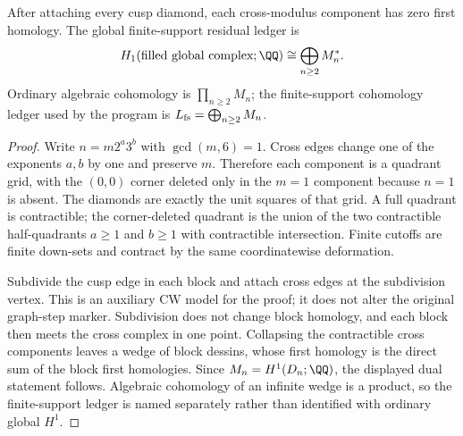 \begin{theorem}
\label{thm:diamond}
After attaching every cusp diamond, each cross-modulus component has zero
first homology.  The global finite-support residual ledger is
\[
  H_1(\text{filled global complex};\QQ)
  \cong\bigoplus_{n\ge2} M_n^* .
\]
Ordinary algebraic cohomology is $\prod_{n\ge2}M_n$; the finite-support
cohomology ledger used by the program is $L_{\rm fs}=\bigoplus_{n\ge2}M_n$.
\end{theorem}

\begin{proof}
Write $n=m2^a3^b$ with $\gcd(m,6)=1$.  Cross edges change one of the exponents
$a,b$ by one and preserve $m$.  Therefore each component is a quadrant grid,
with the $(0,0)$ corner deleted only in the $m=1$ component because $n=1$ is
absent.  The diamonds are exactly the unit squares of that grid.  A full
quadrant is contractible; the corner-deleted quadrant is the union of the two
contractible half-quadrants $a\ge1$ and $b\ge1$ with contractible
intersection.  Finite cutoffs are finite down-sets and contract by the same
coordinatewise deformation.

Subdivide the cusp edge in each block and attach cross edges at the subdivision
vertex.  This is an auxiliary CW model for the proof; it does not alter the
original graph-step marker.  Subdivision does not change block homology, and
each block then meets the cross complex in one point.  Collapsing the
contractible cross components leaves a wedge of block dessins, whose first
homology is the direct sum of the block first homologies.  Since
$M_n=H^1(D_n;\QQ)$, the displayed dual statement follows.  Algebraic
cohomology of an infinite wedge is a product, so the finite-support ledger is
named separately rather than identified with ordinary global $H^1$.
\end{proof}
